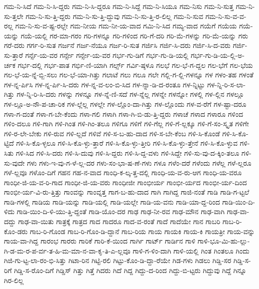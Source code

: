 {ಗಮ-ನಿ-ಸಿದೆ
ಗಮ-ನಿ-ಸಿ-ದ್ದರು
ಗಮ-ನಿ-ಸಿ-ದ್ದರೂ
ಗಮ-ನಿ-ಸಿದ್ದೆ
ಗಮ-ನಿ-ಸಿಯೂ
ಗಮ-ನಿಸು
ಗಮ-ನಿ-ಸುತ್ತ
ಗಮ-ನಿ-ಸು-ತ್ತಲೇ
ಗಮ-ನಿ-ಸು-ತ್ತಿ-ದ್ದರು
ಗಮ-ನಿ-ಸು-ತ್ತಿ-ದ್ದುವು
ಗಮ-ನಿ-ಸು-ತ್ತಿ-ರ-ಲಿಲ್ಲ
ಗಮ-ನಿ-ಸುವ
ಗಮ-ನಿ-ಸು-ವ-ವ-ರಲ್ಲ
ಗಮ-ನಿ-ಸು-ವ-ಷ್ಟ-ರಲ್ಲೇ
ಗಮ-ನೀಯ
ಗಮ-ನೀ-ಯ-ವಾದ
ಗಮಿ-ನಿ-ಸಿದ
ಗಮ್ಯ-ವಾದ
ಗಯೆಗೆ
ಗಯೆಯ
ಗಯೆ-ಯನ್ನು
ಗಯೆ-ಯಲ್ಲಿ
ಗರ-ಮಾ-ಗರಂ
ಗರಿ-ಗಳನ್ನೂ
ಗರಿ-ಗಳಿಂದ
ಗರಿ-ಗೆ-ದರಿ
ಗರಿ-ಮೆ-ಗಳನ್ನು
ಗರಿ-ಮೆ-ಯನ್ನು
ಗರು
ಗರೆ-ದರು
ಗರ್ಗ-ರಿ-ಸುತ
ಗರ್ಜನೆ
ಗರ್ಜ-ನೆಯೂ
ಗರ್ಜ-ರಿ-ಸುತ
ಗರ್ಜಿಸಿ
ಗರ್ಜಿ-ಸಿ-ದರು
ಗರ್ಜಿ-ಸಿ-ದ-ವರು
ಗರ್ಜಿ-ಸು-ತ್ತಾರೆ
ಗರ್ನ್ಸೆ-ಯ-ವರ
ಗರ್ನ್ಸೇ
ಗರ್ನ್ಸೇ-ಯ-ವರ
ಗರ್ಭ-ಗು-ಡಿಗೆ
ಗರ್ಭ-ಗು-ಡಿ-ಯಲ್ಲಿ
ಗರ್ಭ-ಗು-ಡಿ-ಯ-ಲ್ಲಿ-ಅ-ರ್ಚಕ
ಗರ್ಭ-ದಲ್ಲಿ
ಗರ್ಭ-ಪಾತ
ಗರ್ಭಿ-ಣಿ-ಯಾಗಿ
ಗರ್ಲ್ಸ್
ಗರ್ವಿ-ಷ್ಠಳೂ
ಗಲಭೆ
ಗಲ-ಭೆ-ಗ-ದ್ದಲ
ಗಲ-ಭೆಗೆ
ಗಲ-ಭೆಯ
ಗಲ-ಭೆ-ಯ-ನ್ನೆ-ಬ್ಬಿ-ಸಲು
ಗಲ-ಭೆ-ಯಾ-ಗಿತ್ತು
ಗಲಾಟೆ
ಗಲು
ಗಲೂ
ಗಲೇ
ಗಲ್ಲಿ-ಗ-ಲ್ಲಿ-ಗಳನ್ನೂ
ಗಳ
ಗಳಂ-ತಹ
ಗಳಂತೆ
ಗಳ-ನ್ನ-ರ್ಪಿಸಿ
ಗಳ-ನ್ನ-ರ್ಪಿ-ಸಿ-ದರು
ಗಳ-ನ್ನ-ವ-ಲಂ-ಬಿ-ಸಿದ
ಗಳ-ನ್ನಾ-ಡಿ-ದ-ರಂತೂ
ಗಳ-ನ್ನಿಟ್ಟು
ಗಳ-ನ್ನಿ-ರಿ-ಸ-ಲಾ-ಗಿತ್ತು
ಗಳ-ನ್ನಿ-ರಿ-ಸಿ-ದರು
ಗಳನ್ನು
ಗಳನ್ನೂ
ಗಳ-ನ್ನೆ-ಣಿ-ಸದೆ
ಗಳ-ನ್ನೆಲ್ಲ
ಗಳನ್ನೇ
ಗಳನ್ನೋ
ಗಳಲ್ಲಿ
ಗಳ-ಲ್ಲಿನ
ಗಳಲ್ಲೂ
ಗಳ-ಲ್ಲೂ-ಅ-ನೌ-ಪ-ಚಾ-ರಿಕ
ಗಳ-ಲ್ಲೆಲ್ಲ
ಗಳಲ್ಲೇ
ಗಳ-ಲ್ಲೊಂ-ದಾ-ಗಿತ್ತು
ಗಳ-ಲ್ಲೊಂದು
ಗಳ-ವ-ರೆಗೆ
ಗಳ-ಷ್ಟಾ-ದರೂ
ಗಳಾ-ಗ-ದಂತೆ
ಗಳಾ-ಗ-ಬೇ-ಕೆಂದು
ಗಳಾ-ಗಲಿ
ಗಳಾಗಿ
ಗಳಾ-ಗಿ-ಬಿ-ಡು-ತ್ತಿ-ದ್ದರು
ಗಳಾಚೆ
ಗಳಾದ
ಗಳಾರೂ
ಗಳಿಂದ
ಗಳಿಂ-ದಲೂ
ಗಳಿ-ಗಾಗಿ
ಗಳಿ-ಗಿಂತ
ಗಳಿ-ಗಿಂ-ತಲೂ
ಗಳಿಗೂ
ಗಳಿಗೆ
ಗಳಿ-ಗೆಲ್ಲ
ಗಳಿ-ಗೆ-ಲ್ಲಕ್ಕೂ
ಗಳಿ-ಗೆ-ಸಂ-ಸ್ಕೃತ
ಗಳಿಗೇ
ಗಳಿ-ರ-ಲೇ-ಬೇಕು
ಗಳಿ-ರುವ
ಗಳಿ-ಲ್ಲದೆ
ಗಳಿವೆ
ಗಳಿ-ಸ-ಬ-ಹು-ದಾದ
ಗಳಿ-ಸ-ಬೇ-ಕೆಂಬ
ಗಳಿ-ಸಿ-ಕೊಂಡೆ
ಗಳಿ-ಸಿ-ಕೊ-ಟ್ಟಿದೆ
ಗಳಿ-ಸಿ-ಕೊ-ಳ್ಳಲೂ
ಗಳಿ-ಸಿ-ಕೊ-ಳ್ಳು-ತ್ತಾರೆ
ಗಳಿ-ಸಿ-ಕೊ-ಳ್ಳು-ತ್ತೀರಿ
ಗಳಿ-ಸಿ-ಕೊ-ಳ್ಳು-ತ್ತೇನೆ
ಗಳಿ-ಸಿ-ಕೊ-ಳ್ಳುವ
ಗಳಿ-ಸಿತು
ಗಳಿ-ಸಿದ
ಗಳಿ-ಸಿ-ದರು
ಗಳಿ-ಸಿ-ದುವು
ಗಳಿ-ಸಿ-ದ್ದರು
ಗಳಿ-ಸಿ-ದ್ದ-ವಳು
ಗಳಿ-ಸಿದ್ದೇ
ಗಳಿ-ಸು-ವು-ದ-ಕ್ಕಿಂ-ತಲೂ
ಗಳಿ-ಸು-ವುದೇ
ಗಳು
ಗಳು-ಇ-ವು-ಗ-ಳೆ-ಲ್ಲ-ದರ
ಗಳು-ಸಂ-ಭಾ-ಷ-ಣೆ-ಗಳು
ಗಳೂ
ಗಳೆಂ-ದರೆ
ಗಳೆಂದು
ಗಳೆಲ್ಲ
ಗಳೆ-ಲ್ಲರೂ
ಗಳೆ-ಲ್ಲವೂ
ಗಳೊಂ-ದಿಗೆ
ಗಹನ
ಗಹ-ನ-ವಾದ
ಗಾಂಧಿ-ಕ-ಲ್ಕ-ತ್ತ-ದಲ್ಲಿ
ಗಾಂಧಿ-ಯ-ವ-ರು-ಆಗ
ಗಾಂಧಿ-ಯ-ವರೂ
ಗಾಂಧೀ-ಜಿ-ಯ-ವ-ರಿ-ಗಾದ
ಗಾಂಧೀ-ಜಿ-ಯ-ವರು
ಗಾಂಧೀಜೀ
ಗಾಂಭೀರ್ಯ
ಗಾಂಭೀ-ರ್ಯದ
ಗಾಂಭೀ-ರ್ಯ-ದಿಂದ
ಗಾಂಭೀ-ರ್ಯ-ವಿ-ರು-ತ್ತಿತ್ತು
ಗಾಂವನ್ನು
ಗಾಂವ್ನತ್ತ
ಗಾಗ-ಬ-ಹು-ದಾದ
ಗಾಗಿ
ಗಾಗಿದ್ದ
ಗಾಜಿ-ನಂತೆ
ಗಾಡಿ
ಗಾಡಿ-ಗ-ಟ್ಟಲೆ
ಗಾಡಿ-ಗಳಲ್ಲಿ
ಗಾಡಿಯ
ಗಾಡಿ-ಯನ್ನು
ಗಾಡಿ-ಯಲ್ಲಿ
ಗಾಡಿ-ಯಲ್ಲೇ
ಗಾಡಿ-ಯ-ವನು
ಗಾಡಿ-ಯಾ-ದ್ದ-ರಿಂದ
ಗಾಡಿ-ಯಿಂ-ದಿ-ಳಿದು
ಗಾಡಿ-ಯಿಂ-ದಿ-ಳಿ-ಯು-ತ್ತಿ-ದ್ದಂತೆ
ಗಾಡಿ-ಯೊಂ-ದರ
ಗಾಢ
ಗಾಢ-ನೀ-ರವ
ಗಾಢ-ಮೌನ
ಗಾಢ-ವಾಗಿ
ಗಾಢ-ವಾ-ದದ್ದು
ಗಾಢ-ವಾ-ಯಿತು
ಗಾತ್ರಕ್ಕೆ
ಗಾತ್ರದ
ಗಾದ
ಗಾದರೂ
ಗಾದ-ವ-ರಂತೆ
ಗಾದೆ
ಗಾದೆಯೇ
ಗಾನ
ಗಾಬರಿ
ಗಾಬ-ರಿ-ಕೊಂ-ಡರು
ಗಾಬ-ರಿ-ಗೊಂಡ
ಗಾಬ-ರಿ-ಗೊಂ-ಡಿ-ದ್ದಾನೆ
ಗಾಬ-ರಿಯ
ಗಾಯ
ಗಾಯಕಿ
ಗಾಯ-ಕಿ
ಗಾಯತ್ರೀ
ಗಾಯ-ವನ್ನು
ಗಾಯ-ವಾ-ಗಿದ್ದ
ಗಾರಂಭ
ಗಾರರು
ಗಾರಿಕೆ
ಗಾರಿ-ಕೆ-ಯಿಂದ
ಗಾರ್ಗಿ
ಗಾರ್ಟ್
ಗಾರ್ಡಿನ
ಗಾಳಿ
ಗಾಳಿ-ಭೂ-ಮಿ-ಹು-ಲ್ಲು-ಗಿ-ಡ-ಮ-ರ-ಪ-ರ್ವ-ತ-ಹಿ-ಮ-ಮಾ-ನ-ವಾ-ಕೃ-ತಿ-ಎ-ಲ್ಲವೂ
ಗಾಳಿ-ಗ-ಳಿಂ-ದಾಗಿ
ಗಾಳಿ-ಯಲ್ಲಿ
ಗಿಂತ
ಗಿಂತಲೂ
ಗಿಂದು
ಗಿಜಿ-ಗು-ಟ್ಟ-ಲಾ-ರಂ-ಭಿ-ಸಿತ್ತು
ಗಿಟಾ-ರಿನ
ಗಿಟ್ಟಿ-ರಲಿ
ಗಿಟ್ಟು-ಕೊಂ-ಡಿ-ದ್ದಾ-ರೆಯೇ
ಗಿಡ-ಗಳು
ಗಿಡಲು
ಗಿಡ್ಡಿ-ಸರ
ಗಿಡ್ಡಿ-ಸ-ರಿಗೆ
ಗಿಡ್ಡಿ-ಸ-ರೊಂ-ದಿಗೆ
ಗಿಡ್ಡಿಸ್
ಗಿತ್ತು
ಗಿತ್ತೆ
ಗಿದರು
ಗಿದೆ
ಗಿದ್ದ
ಗಿದ್ದು-ದ-ರಿಂದ
ಗಿದ್ದು-ಬಿ-ಟ್ಟರು
ಗಿದ್ದುವು
ಗಿದ್ದೆ
ಗಿನ್ನೂ
ಗಿರ-ಲಿಲ್ಲ
}
